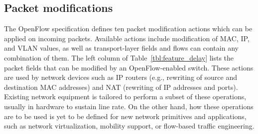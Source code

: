 
\subsection{Packet modifications}\label{sec:results-packets}


The OpenFlow specification \cite{openflow-spec} defines ten packet
modification actions which can be applied on incoming
packets. Available actions include modification of MAC, IP, and VLAN
values, as well as transport-layer fields and flows can
contain any combination of them. The left column of
Table~\ref{tbl:feature_delay} lists the packet fields that can be
modified by an OpenFlow-enabled switch.
These actions are used by network devices such as IP routers (e.g.,
rewriting of source and destination MAC addresses) and NAT (rewriting
of IP addresses and ports). Existing network equipment is tailored to
perform a subset of these operations, usually in hardware to sustain
line rate. On the other hand, how these operations are to be used is
yet to be defined for new network primitives and applications, such as
network virtualization, mobility support, or flow-based traffic
engineering.

